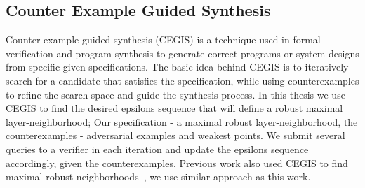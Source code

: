\subsection{Counter Example Guided Synthesis}
Counter example guided synthesis (CEGIS) is a technique used in formal verification and program synthesis to generate correct programs or system designs from specific given specifications.
The basic idea behind CEGIS is to iteratively search for a candidate that satisfies the specification, while using counterexamples to refine the search space and guide the synthesis process.
In this thesis we use CEGIS to find the desired epsilons sequence that will define a robust maximal layer-neighborhood;
Our specification - a maximal robust layer-neighborhood, the counterexamples - adversarial examples and weakest points.
We submit several queries to a verifier in each iteration and update the epsilons sequence accordingly, given the counterexamples.
Previous work also used CEGIS to find maximal robust neighborhoods~\cite{MARVEL}, we use similar approach as this work.